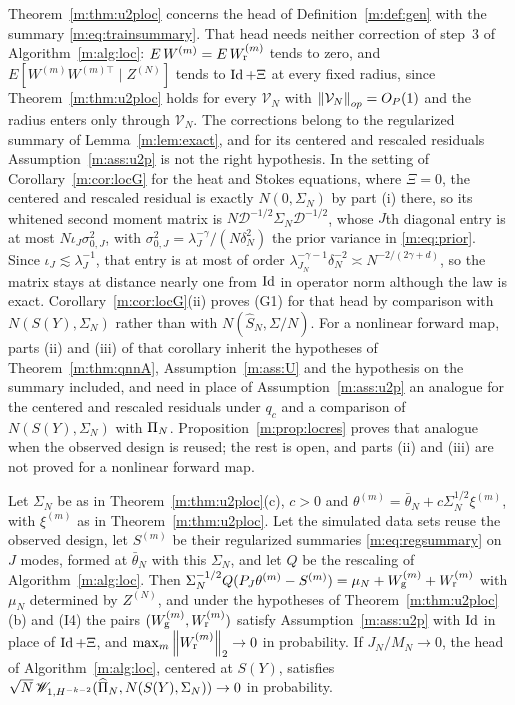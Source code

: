 \begin{remark}\label{m:rem:u2pres}
Theorem~\ref{m:thm:u2ploc} concerns the head of Definition~\ref{m:def:gen} with the summary \eqref{m:eq:trainsummary}. That head needs neither correction of step~3 of Algorithm~\ref{m:alg:loc}: $E\,W^{(m)}=E\,W^{(m)}_{\rm r}$ tends to zero, and $E[W^{(m)}W^{(m)\top}\mid Z^{(N)}]$ tends to $\operatorname{Id}+\Xi$ at every fixed radius, since Theorem~\ref{m:thm:u2ploc} holds for every $\mathcal V_N$ with $\left\|\mathcal V_N\right\|_{op}=O_P(1)$ and the radius enters only through $\mathcal V_N$. The corrections belong to the regularized summary of Lemma~\ref{m:lem:exact}, and for its centered and rescaled residuals Assumption~\ref{m:ass:u2p} is not the right hypothesis. In the setting of Corollary~\ref{m:cor:locG} for the heat and Stokes equations, where $\Xi=0$, the centered and rescaled residual is exactly $N(0,\Sigma_N)$ by part (i) there, so its whitened second moment matrix is $N\mathcal D^{-1/2}\Sigma_N\mathcal D^{-1/2}$, whose $J$th diagonal entry is at most $N\iota_J\sigma^2_{0,J}$, with $\sigma^2_{0,J}=\lambda_J^{-\gamma}/(N\delta_N^2)$ the prior variance in \eqref{m:eq:prior}. Since $\iota_J\lesssim\lambda_J^{-1}$, that entry is at most of order $\lambda_{J_N}^{-\gamma-1}\delta_N^{-2}\asymp N^{-2/(2\gamma+d)}$, so the matrix stays at distance nearly one from $\operatorname{Id}$ in operator norm although the law is exact. Corollary~\ref{m:cor:locG}(ii) proves (G1) for that head by comparison with $N(S(Y),\Sigma_N)$ rather than with $N(\hat S_N,\Sigma/N)$. For a nonlinear forward map, parts (ii) and (iii) of that corollary inherit the hypotheses of Theorem~\ref{m:thm:qnnA}, Assumption~\ref{m:ass:U} and the hypothesis on the summary included, and need in place of Assumption~\ref{m:ass:u2p} an analogue for the centered and rescaled residuals under $q_c$ and a comparison of $N(S(Y),\Sigma_N)$ with $\Pi_N$. Proposition~\ref{m:prop:locres} proves that analogue when the observed design is reused; the rest is open, and parts (ii) and (iii) are not proved for a nonlinear forward map.
\end{remark}

\begin{proposition}\label{m:prop:locres}
Let $\Sigma_N$ be as in Theorem~\ref{m:thm:u2ploc}(c), $c>0$ and $\theta^{(m)}=\bar\theta_N+c\Sigma_N^{1/2}\xi^{(m)}$, with $\xi^{(m)}$ as in Theorem~\ref{m:thm:u2ploc}. Let the simulated data sets reuse the observed design, let $S^{(m)}$ be their regularized summaries \eqref{m:eq:regsummary} on $J$ modes, formed at $\bar\theta_N$ with this $\Sigma_N$, and let $Q$ be the rescaling of Algorithm~\ref{m:alg:loc}. Then $\Sigma_N^{-1/2}Q(P_J\theta^{(m)}-S^{(m)})=\mu_N+W^{(m)}_{\rm g}+W^{(m)}_{\rm r}$ with $\mu_N$ determined by $Z^{(N)}$, and under the hypotheses of Theorem~\ref{m:thm:u2ploc}(b) and (I4) the pairs $(W^{(m)}_{\rm g},W^{(m)}_{\rm r})$ satisfy Assumption~\ref{m:ass:u2p} with $\operatorname{Id}$ in place of $\operatorname{Id}+\Xi$, and $\max_m\left\|W^{(m)}_{\rm r}\right\|_2\to0$ in probability. If $J_N/M_N\to0$, the head of Algorithm~\ref{m:alg:loc}, centered at $S(Y)$, satisfies $\sqrt N\,\mathscr{W}_{1,H^{-k-2}}(\widehat\Pi_N,N(S(Y),\Sigma_N))\to0$ in probability.
\end{proposition}

